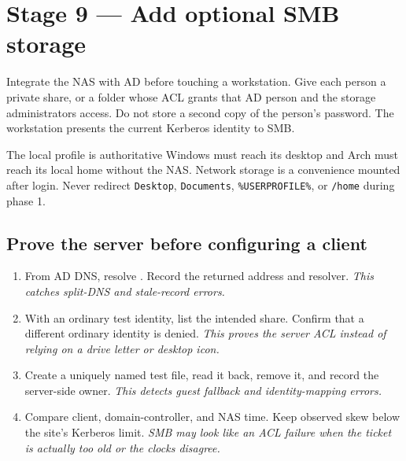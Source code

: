 \section{Stage 9 --- Add optional SMB storage}

Integrate the NAS with AD before touching a workstation. Give each person a
private share, or a folder whose ACL grants that AD person and the storage
administrators access. Do not store a second copy of the person's password.
The workstation presents the current Kerberos identity to SMB.

\begin{gate}{The local profile is authoritative}
Windows must reach its desktop and Arch must reach its local home without the
NAS. Network storage is a convenience mounted after login. Never redirect
\texttt{Desktop}, \texttt{Documents}, \texttt{\%USERPROFILE\%}, or
\texttt{/home} during phase 1.
\end{gate}

\subsection*{Prove the server before configuring a client}

\begin{enumerate}
\item From AD DNS, resolve . Record the returned
address and resolver. \textit{This catches split-DNS and stale-record errors.}
\item With an ordinary test identity, list the intended share. Confirm that a
different ordinary identity is denied. \textit{This proves the server ACL
instead of relying on a drive letter or desktop icon.}
\item Create a uniquely named test file, read it back, remove it, and record
the server-side owner. \textit{This detects guest fallback and identity-mapping
errors.}
\item Compare client, domain-controller, and NAS time. Keep observed skew below
the site's Kerberos limit. \textit{SMB may look like an ACL failure when the
ticket is actually too old or the clocks disagree.}
\end{enumerate}


